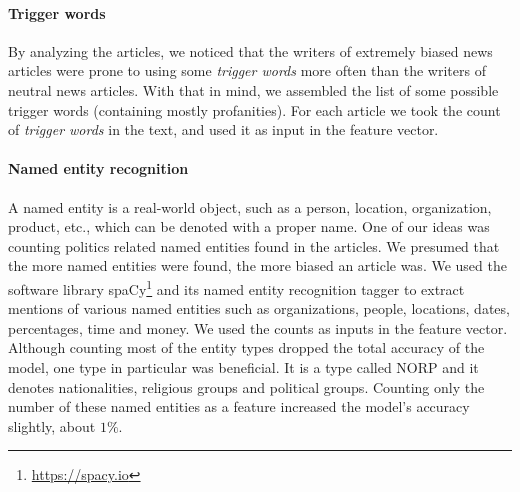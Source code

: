 \paragraph{Trigger words\\}


By analyzing the articles, we noticed that the writers of extremely biased news articles were prone to using some \textit{trigger words} more often than the writers of neutral news articles. With that in mind, we assembled the list of some possible trigger words (containing mostly profanities). For each article we took the count of \textit{trigger words} in the text, and used it as input in the feature vector.


\paragraph{Named entity recognition\\}


 A named entity is a real-world object, such as a person, location, organization, product, etc., which can be denoted with a proper name. One of our ideas was counting politics related named entities found in the articles. We presumed that the more named entities were found, the more biased an article was. We used the software library spaCy\footnote{\url{https://spacy.io}} and its named entity recognition tagger to extract mentions of various named entities such as organizations, people, locations, dates, percentages, time and money. We used the counts as inputs in the feature vector. Although counting most of the entity types dropped the total accuracy of the model, one type in particular was beneficial. It is a type called NORP and it denotes nationalities, religious groups and political groups. Counting only the number of these named entities as a feature increased the model's accuracy slightly, about $1\%$.
 
